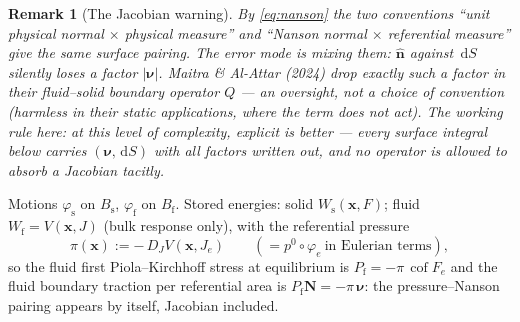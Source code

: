 \documentclass[11pt]{article}
\newtheorem{remark}{Remark}
\newcommand{\Bs}{B_{\mathrm{s}}}
\newcommand{\Bf}{B_{\mathrm{f}}}
\newcommand{\bnu}{\bm{\nu}}
\newcommand{\bN}{\mathbf{N}}
\newcommand{\bx}{\mathbf{x}}
\newcommand{\dS}{\,\mathrm{d}S}
\newcommand{\cof}{\operatorname{cof}}
\begin{document}
\begin{remark}[The Jacobian warning]\label{rem:jacobian}
By \eqref{eq:nanson} the two conventions ``unit physical normal
$\times$ physical measure'' and ``Nanson normal $\times$ referential
measure'' give the \emph{same} surface pairing. The error mode is
mixing them: $\hat{\mathbf{n}}$ against $\dS$ silently loses a factor
$|\bnu|$. Maitra \& Al-Attar (2024) drop exactly such a factor in
their fluid--solid boundary operator $Q$ --- an oversight, not a
choice of convention (harmless in their static applications, where the
term does not act). The working rule here: at this level of
complexity, \emph{explicit is better} --- every surface integral below
carries $(\bnu, \dS)$ with all factors written out, and no operator is
allowed to absorb a Jacobian tacitly.
\end{remark}

Motions $\varphi_{\mathrm{s}}$ on $\Bs$, $\varphi_{\mathrm{f}}$ on
$\Bf$. Stored energies: solid $W_{\mathrm{s}}(\bx, F)$; fluid
$W_{\mathrm{f}} = V(\bx, J)$ (bulk response only), with the referential
pressure
\begin{equation}
  \pi(\bx) := -\,D_J V(\bx, J_e)
  \qquad (= p^0 \circ \varphi_e \ \text{in Eulerian terms}),
\end{equation}
so the fluid first Piola--Kirchhoff stress at equilibrium is
$P_{\mathrm{f}} = -\pi\,\cof F_e$ and the fluid boundary traction per
referential area is $P_{\mathrm{f}}\bN = -\pi\,\bnu$: the
pressure--Nanson pairing appears by itself, Jacobian included.
\end{document}
